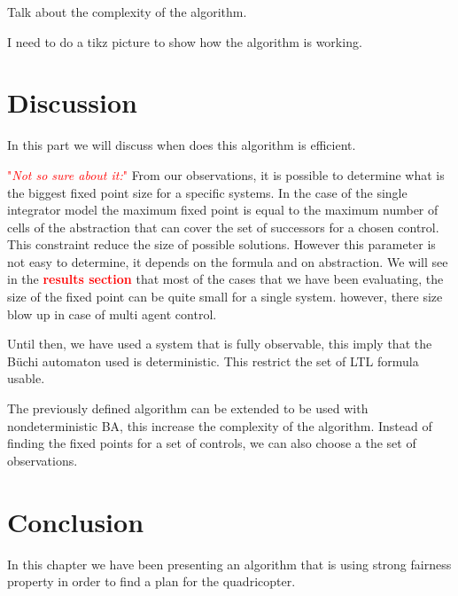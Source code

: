 \documentclass{article}
\newcommand\comment[1]{\textcolor{red}{"\textit{#1}"}}
\newcommand\todo[1]{\textcolor{red}{\textbf{#1}}}
\theoremstyle{named}
\newcommand{\buchi}[0]{B\"uchi}
\begin{document}
Talk about the complexity of the algorithm.

I need to do a tikz picture to show how the algorithm is working.

\section{Discussion}
In this part we will discuss when does this algorithm is efficient.

\comment{Not so sure about it:}
From our observations, it is possible to determine what is the biggest fixed point size for a specific systems.
In the case of the single integrator model the maximum fixed point is equal to the maximum number of cells of the abstraction that can cover the set of successors for a chosen control.
This constraint reduce the size of possible solutions.
However this parameter is not easy to determine, it depends on the formula and on abstraction.
We will see in the \todo{results section} that most of the cases that we have been evaluating, the size of the fixed point can be quite small for a single system. however, there size blow up in case of multi agent control.

Until then, we have used a system that is fully observable, this imply that the \buchi{} automaton used is deterministic.
This restrict the set of LTL formula usable. 

The previously defined algorithm can be extended to be used with nondeterministic BA, this increase the complexity of the algorithm. 
Instead of finding the fixed points for a set of controls, we can also choose a the set of observations.

\section{Conclusion}
In this chapter we have been presenting an algorithm that is using strong fairness property in order to find a plan for the quadricopter.

{}

\end{document}
